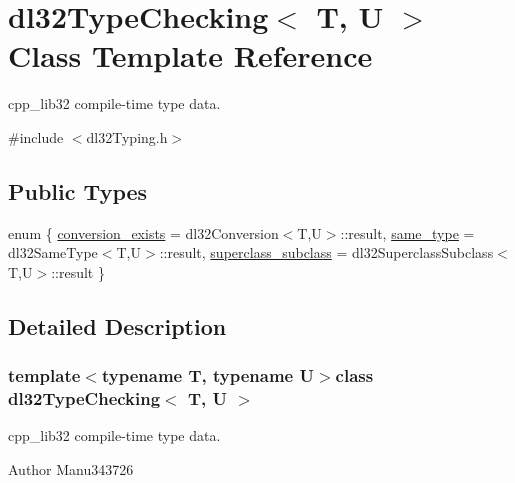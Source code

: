 \hypertarget{classdl32_type_checking}{\section{dl32\-Type\-Checking$<$ T, U $>$ Class Template Reference}
\label{classdl32_type_checking}
}


cpp\-\_\-lib32 compile-\/time type data.  




{\ttfamily \#include $<$dl32\-Typing.\-h$>$}

\subsection*{Public Types}
\begin{DoxyCompactItemize}
\item 
enum \{ \hyperlink{classdl32_type_checking_af704e66eb52ac323db77bb4b6641bf23a87324d6082ae17d85c78bfbe767193a3}{conversion\-\_\-exists} = dl32\-Conversion$<$T,U$>$\-:\-:result, 
\hyperlink{classdl32_type_checking_af704e66eb52ac323db77bb4b6641bf23af85164cb8544485dbc44c84c2b211f59}{same\-\_\-type} = dl32\-Same\-Type$<$T,U$>$\-:\-:result, 
\hyperlink{classdl32_type_checking_af704e66eb52ac323db77bb4b6641bf23aae27a8c3b30cec53193637ca0ca5c554}{superclass\-\_\-subclass} = dl32\-Superclass\-Subclass$<$T,U$>$\-:\-:result
 \}
\end{DoxyCompactItemize}


\subsection{Detailed Description}
\subsubsection*{template$<$typename T, typename U$>$class dl32\-Type\-Checking$<$ T, U $>$}

cpp\-\_\-lib32 compile-\/time type data. 

\begin{DoxyAuthor}{Author}
Manu343726 
\end{DoxyAuthor}



